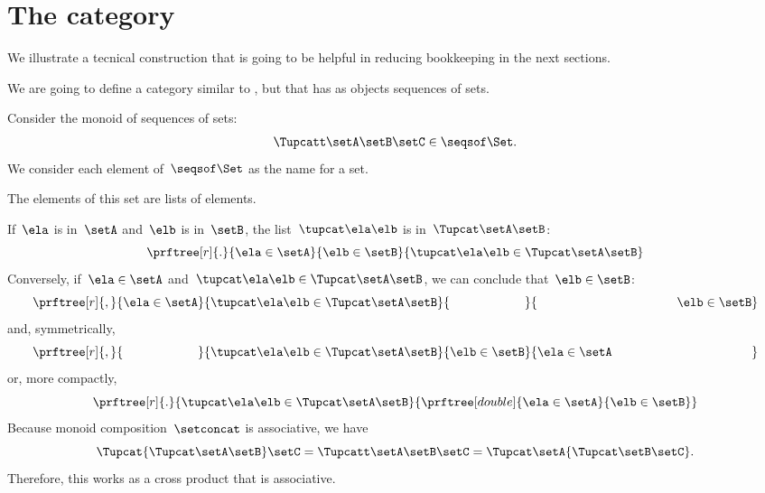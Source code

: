 \section{The \SetStar category}
\label{sec:SetStar}

We illustrate a tecnical construction that is going to be helpful in reducing bookkeeping in the next sections.

We are going to define a category similar to \Set, but that has as objects sequences of sets.

Consider the monoid of sequences of sets:
%
\begin{equation}
    \label{eq:sets-monoid}
    \Tupcatt \setA  \setB  \setC \in \seqsof\Set.
\end{equation}
%
We consider each element of~$\seqsof\Set$ as the name for a set.

The elements of this set are lists of elements.

If~$\ela$ is in~$\setA$ and~$\elb$ is in~$\setB$, the list~$\tupcat \ela \elb$ is in~$\Tupcat \setA \setB$:
%
\begin{equation}
    \label{eq:sets-monoid-axiom1}
    \prftree[r]{.}{
        \ela \in \setA
    }{
        \elb \in \setB
    }{ 
        \tupcat \ela \elb \in \Tupcat \setA \setB 
    }
\end{equation}
%
Conversely, if~$\ela \in \setA$ and~$\tupcat \ela \elb \in \Tupcat \setA \setB$, we can conclude that~$\elb \in \setB$:
%
\begin{equation}
    \label{eq:sets-monoid-axiom2}
    \prftree[r]{,}{
        \ela \in \setA
    }{ 
        \tupcat \ela \elb \in \Tupcat \setA  \setB
    }{
        \phantom{\elb \in \setB}
    }{  
        \rule{39mm}{0pt} \elb \in  \setB 
    }
\end{equation}
% 
and, symmetrically, 
% 
\begin{equation}
    \label{eq:sets-monoid-axiom3}
    \prftree[r]{,}{
        \phantom{\ela \in \setA}
    }{
        \tupcat \ela \elb \in \Tupcat \setA \setB  
    }{
        \elb \in \setB
    }{  
        \ela \in  \setA \rule{39mm}{0pt}
    }
\end{equation}
%
or, more compactly,
% 
\begin{equation}
    \label{eq:sets-monoid-axiom3}
    \prftree[r]{.}{
        \tupcat \ela \elb \in \Tupcat \setA \setB  
    }{
        \prftree[double]{
            \ela \in \setA
        }{
            \elb \in \setB
        }
    }
\end{equation}
% 
Because monoid composition~$\setconcat$ is associative, we have
%
\begin{equation}
    \label{eq:sets-monoid-comp}
    \Tupcat {\Tupcat \setA  \setB}  \setC  =
    \Tupcatt \setA    \setB \setC  =
    \Tupcat   \setA  {\Tupcat \setB  \setC}.
\end{equation}
%
Therefore, this works as a cross product that is associative.


